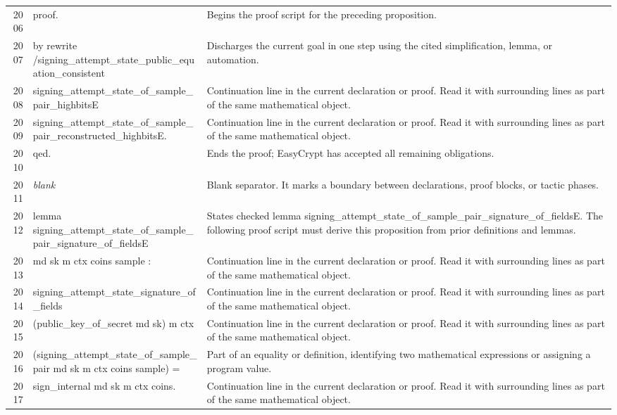 \documentclass[10pt]{article}
\begin{document}
\begin{longtable}{r L{0.53\textwidth} L{0.37\textwidth}}
2006 & {\ttfamily\scriptsize proof.} & Begins the proof script for the preceding proposition. \\
2007 & {\ttfamily\scriptsize by rewrite /signing\_attempt\_state\_public\_equation\_consistent} & Discharges the current goal in one step using the cited simplification, lemma, or automation. \\
2008 & {\ttfamily\scriptsize            signing\_attempt\_state\_of\_sample\_pair\_highbitsE} & Continuation line in the current declaration or proof.  Read it with surrounding lines as part of the same mathematical object. \\
2009 & {\ttfamily\scriptsize            signing\_attempt\_state\_of\_sample\_pair\_reconstructed\_highbitsE.} & Continuation line in the current declaration or proof.  Read it with surrounding lines as part of the same mathematical object. \\
2010 & {\ttfamily\scriptsize qed.} & Ends the proof; EasyCrypt has accepted all remaining obligations. \\
2011 & {\ttfamily\scriptsize \emph{blank}} & Blank separator.  It marks a boundary between declarations, proof blocks, or tactic phases. \\
2012 & {\ttfamily\scriptsize lemma signing\_attempt\_state\_of\_sample\_pair\_signature\_of\_fieldsE} & States checked lemma signing\_attempt\_state\_of\_sample\_pair\_signature\_of\_fieldsE.  The following proof script must derive this proposition from prior definitions and lemmas. \\
2013 & {\ttfamily\scriptsize    md sk m ctx coins sample :} & Continuation line in the current declaration or proof.  Read it with surrounding lines as part of the same mathematical object. \\
2014 & {\ttfamily\scriptsize   signing\_attempt\_state\_signature\_of\_fields} & Continuation line in the current declaration or proof.  Read it with surrounding lines as part of the same mathematical object. \\
2015 & {\ttfamily\scriptsize     (public\_key\_of\_secret md sk) m ctx} & Continuation line in the current declaration or proof.  Read it with surrounding lines as part of the same mathematical object. \\
2016 & {\ttfamily\scriptsize     (signing\_attempt\_state\_of\_sample\_pair md sk m ctx coins sample) =} & Part of an equality or definition, identifying two mathematical expressions or assigning a program value. \\
2017 & {\ttfamily\scriptsize   sign\_internal md sk m ctx coins.} & Continuation line in the current declaration or proof.  Read it with surrounding lines as part of the same mathematical object. \\

\end{longtable}
\end{document}
